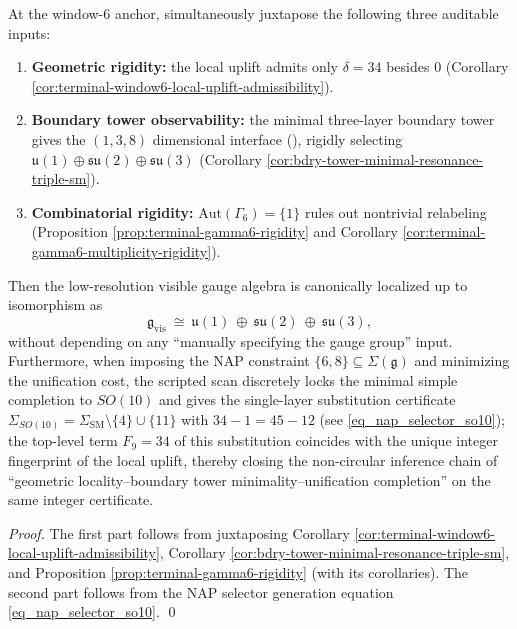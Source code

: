 \begin{corollary}\label{cor:window6-threefold-rigidity-closure-sm-so10}
At the window-\(6\) anchor, simultaneously juxtapose the following three auditable inputs:
\begin{enumerate}
  \item \textbf{Geometric rigidity:} the local uplift admits only \(\delta=34\) besides \(0\) (Corollary \ref{cor:terminal-window6-local-uplift-admissibility}).
  \item \textbf{Boundary tower observability:} the minimal three-layer boundary tower gives the \((1,3,8)\) dimensional interface (\texttt{}), rigidly selecting \(\mathfrak u(1)\oplus\mathfrak{su}(2)\oplus\mathfrak{su}(3)\) (Corollary \ref{cor:bdry-tower-minimal-resonance-triple-sm}).
  \item \textbf{Combinatorial rigidity:} \(\mathrm{Aut}(\Gamma_6)=\{1\}\) rules out nontrivial relabeling (Proposition \ref{prop:terminal-gamma6-rigidity} and Corollary \ref{cor:terminal-gamma6-multiplicity-rigidity}).
\end{enumerate}
Then the low-resolution visible gauge algebra is canonically localized up to isomorphism as
\[
\mathfrak g_{\mathrm{vis}}\ \cong\ \mathfrak u(1)\ \oplus\ \mathfrak{su}(2)\ \oplus\ \mathfrak{su}(3),
\]
without depending on any ``manually specifying the gauge group'' input.
Furthermore, when imposing the NAP constraint \(\{6,8\}\subseteq \Sigma(\mathfrak g)\) and minimizing the unification cost,
the scripted scan discretely locks the minimal simple completion to \(SO(10)\) and gives the single-layer substitution certificate
\(
\Sigma_{SO(10)}=\Sigma_{\mathrm{SM}}\setminus\{4\}\cup\{11\}
\)
with \(34-1=45-12\) (see \eqref{eq_nap_selector_so10});
the top-level term \(F_9=34\) of this substitution coincides with the unique integer fingerprint of the local uplift, thereby closing the non-circular inference chain of ``geometric locality--boundary tower minimality--unification completion'' on the same integer certificate.
\end{corollary}
\begin{proof}
The first part follows from juxtaposing Corollary \ref{cor:terminal-window6-local-uplift-admissibility}, Corollary \ref{cor:bdry-tower-minimal-resonance-triple-sm}, and Proposition \ref{prop:terminal-gamma6-rigidity} (with its corollaries).
The second part follows from the NAP selector generation equation \eqref{eq_nap_selector_so10}. \qed
\end{proof}

